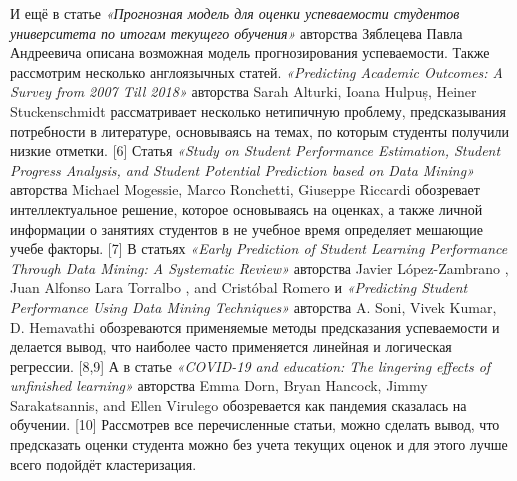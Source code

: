 \documentclass{article}
\begin{document}
И ещё в статье \textit{«Прогнозная модель для оценки успеваемости студентов университета по итогам текущего обучения»} авторства Зяблецева Павла Андреевича описана возможная модель прогнозирования успеваемости.
Также рассмотрим несколько англоязычных статей. \textit{«Predicting Academic Outcomes: A Survey from 2007 Till 2018»} авторства Sarah Alturki, Ioana Hulpuș, Heiner Stuckenschmidt рассматривает несколько нетипичную проблему, предсказывания потребности в литературе, основываясь на темах, по которым студенты получили низкие отметки. [6] Статья \textit{«Study on Student Performance Estimation, Student Progress Analysis, and Student Potential Prediction based on Data Mining»} авторства Michael Mogessie, Marco Ronchetti, Giuseppe Riccardi обозревает интеллектуальное решение, которое основываясь на оценках, а также личной информации о занятиях студентов в не учебное время определяет мешающие учебе факторы. [7] В статьях \textit{«Early Prediction of Student Learning Performance Through Data Mining: A Systematic Review»} авторства Javier López-Zambrano , Juan Alfonso Lara Torralbo , and Cristóbal Romero и \textit{«Predicting Student Performance Using Data Mining Techniques»} авторства A. Soni, Vivek Kumar, D. Hemavathi обозреваются применяемые методы предсказания успеваемости и делается вывод, что наиболее часто применяется линейная и логическая регрессии. [8,9] А в статье \textit{«COVID-19 and education: The lingering effects of unfinished learning»} авторства Emma Dorn, Bryan Hancock, Jimmy Sarakatsannis, and Ellen Virulego обозревается как пандемия сказалась на обучении. [10]
Рассмотрев все перечисленные статьи, можно сделать вывод, что предсказать оценки студента можно без учета текущих оценок и для этого лучше всего подойдёт кластеризация.
\end{document}
